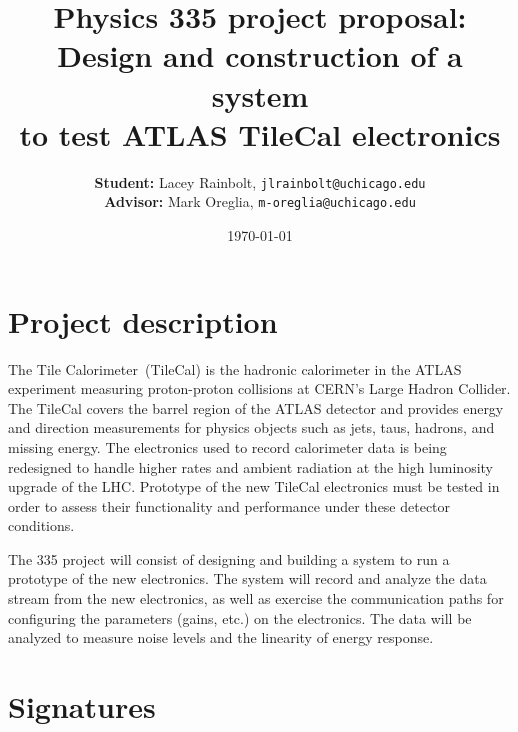 \documentclass[11pt]{article}
\title{Physics 335 project proposal: \\
	Design and construction of a system \\ to test ATLAS TileCal electronics}
\author{\textbf{Student:} Lacey Rainbolt, \texttt{jlrainbolt@uchicago.edu} \\ \textbf{Advisor:} Mark Oreglia, \texttt{m-oreglia@uchicago.edu}}
\date{\today}
\begin{document}
\maketitle

\section*{Project description}

The Tile Calorimeter~(TileCal) is the hadronic calorimeter in the ATLAS experiment measuring proton-proton collisions at CERN's Large Hadron Collider.  The TileCal covers the barrel region of the ATLAS detector and provides energy and direction measurements for physics objects such as jets, taus, hadrons, and missing energy.  The electronics used to record calorimeter data is being redesigned to handle higher rates and ambient radiation at the high luminosity upgrade of the LHC.  Prototype of the new TileCal electronics must be tested in order to assess their functionality and performance under these detector conditions.

The 335 project will consist of designing and building a system to run a prototype of the new electronics.  The system will record and analyze the data stream from the new electronics, as well as exercise the communication paths for configuring the parameters (gains, etc.) on the electronics.  The data will be analyzed to measure noise levels and the linearity of energy response.

\section*{Signatures}
\end{document}

